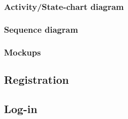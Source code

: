 \subsubsection{Activity/State-chart diagram}
\subsubsection{Sequence diagram}
\subsubsection{Mockups}


\newpage
\subsection{Registration}
  

\newpage
\subsection{Log-in}
  
